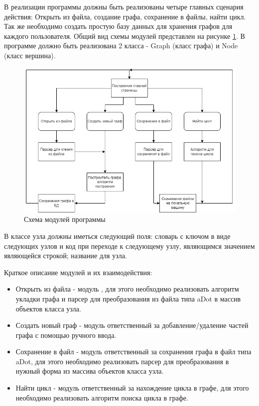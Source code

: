 \def\notedate{2023.01.25}
\def\currentauthor{Журавлев Н.В. (РК6-72Б)}
В реализации программы должны быть реализованы четыре главных сценария действия: Открыть из файла, создание графа, сохранение в файлы, найти цикл. Так же необходимо создать простую базу данных для хранения графов для каждого пользователя. Общий вид схемы модулей представлен на рисунке \ref{fig:module}. В программе должно быть реализована 2 класса - Graph (класс графа) и Node (класс вершина).

\begin{figure}[h]
    \centering
    \includegraphics[width=0.7\linewidth]{ResearchNotes/rndhpc_int_edt_2023_01_25/module.png}
    \caption{Схема модулей программы}
    \label{fig:module}
\end{figure}

В классе узла должны иметься следующий поля: словарь с ключом в виде следующих узлов и код при переходе к следующему узлу, являющимся значением являющейся строкой; название для узла.

Краткое описание модулей и их взаимодействия:
\begin{itemize}
\item Открыть из файла - модуль , для этого необходимо реализовать алгоритм укладки графа и парсер для преобразования из файла типа aDot в массив объектов класса узла.
\item Создать новый граф - модуль ответственный за добавление/удаление частей графа с помощью ручного ввода.
\item Сохранение в файл - модуль ответственный за сохранения графа в файл типа aDot, для этого необходимо реализовать парсер для преобразования в нужный форма из массива объектов класса узла.
\item Найти цикл - модуль ответственный за нахождение цикла в графе, для этого необходимо реализовать алгоритм поиска цикла в графе.
\end{itemize}

